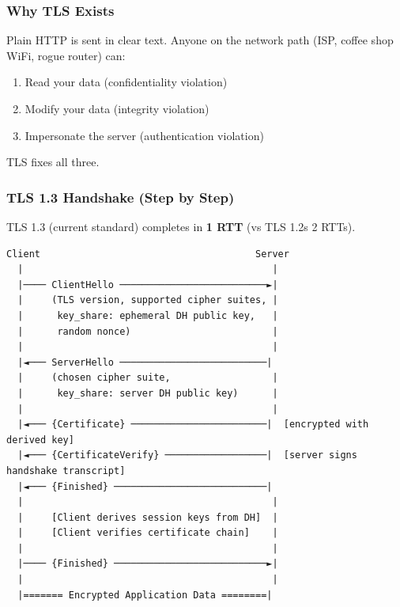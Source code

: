 \documentclass[11pt]{article}
\providecommand{\tightlist}{\setlength{\itemsep}{1pt}\setlength{\parskip}{0pt}}
\begin{document}
\subsubsection{Why TLS Exists}\label{why-tls-exists}

Plain HTTP is sent in clear text. Anyone on the network path (ISP, coffee shop WiFi, rogue router) can:

\begin{enumerate}
\def\labelenumi{\arabic{enumi}.}
\tightlist
\item
  Read your data (confidentiality violation)
\item
  Modify your data (integrity violation)
\item
  Impersonate the server (authentication violation)
\end{enumerate}

TLS fixes all three.

\subsubsection{TLS 1.3 Handshake (Step by Step)}\label{tls-13-handshake-step-by-step}

TLS 1.3 (current standard) completes in \textbf{1 RTT} (vs TLS 1.2\textquotesingle s 2 RTTs).

\setcodelang{}

\begin{verbatim}
Client                                      Server
  |                                            |
  |──── ClientHello ──────────────────────────►|
  |     (TLS version, supported cipher suites, |
  |      key_share: ephemeral DH public key,   |
  |      random nonce)                         |
  |                                            |
  |◄─── ServerHello ──────────────────────────|
  |     (chosen cipher suite,                  |
  |      key_share: server DH public key)      |
  |                                            |
  |◄─── {Certificate} ────────────────────────|  [encrypted with derived key]
  |◄─── {CertificateVerify} ──────────────────|  [server signs handshake transcript]
  |◄─── {Finished} ───────────────────────────|
  |                                            |
  |     [Client derives session keys from DH]  |
  |     [Client verifies certificate chain]    |
  |                                            |
  |──── {Finished} ───────────────────────────►|
  |                                            |
  |======= Encrypted Application Data ========|
\end{verbatim}
\end{document}
